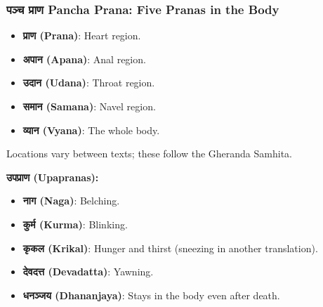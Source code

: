 \begin{frame}[fragile]\frametitle{पञ्च  प्राण  Pancha Prana: Five Pranas in the Body}

	\begin{itemize} 
	\item \textbf{प्राण (Prana)}: Heart region.
	\item \textbf{अपान (Apana)}: Anal region.
	\item \textbf{उदान (Udana)}: Throat region.
	\item \textbf{समान (Samana)}: Navel region.
	\item \textbf{व्यान (Vyana)}: The whole body.
	\end{itemize}
	{\tiny Locations vary between texts; these follow the Gheranda Samhita.}

	\vspace{0.5cm} 
	
	\textbf{उपप्राण (Upapranas):} 
	\begin{itemize} 
	\item \textbf{नाग (Naga)}: Belching.
	\item \textbf{कुर्म (Kurma)}: Blinking.
	\item \textbf{कृकल (Krikal)}: Hunger and thirst (sneezing in another translation).
	\item \textbf{देवदत्त (Devadatta)}: Yawning.
	\item \textbf{धनञ्जय (Dhananjaya)}: Stays in the body even after death.
	\end{itemize}
\end{frame}

